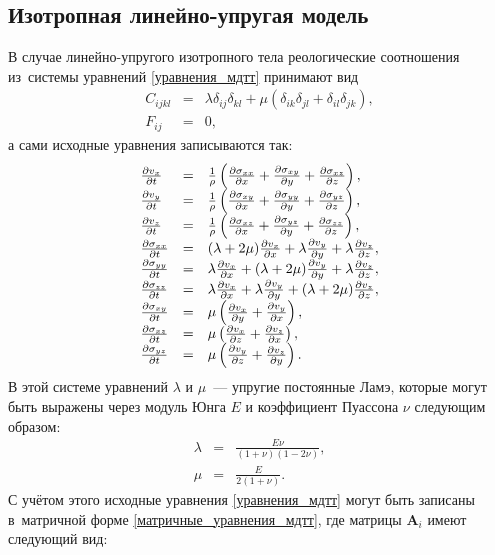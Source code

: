 \documentclass[thesis.tex]{subfiles}
\begin{document}
\subsection{Изотропная линейно-упругая модель}

В случае линейно-упругого изотропного тела реологические соотношения из~системы уравнений \eqref{уравнения_мдтт}  принимают
\cite{ландау1987теория} вид
\[
\begin{array}{lcl}
    C_{ijkl} &=& \lambda\delta_{ij}\delta_{kl} + \mu(\delta_{ik}\delta_{jl}+\delta_{il}\delta_{jk}), \\
    F_{ij} &=& 0,
\end{array}
\]
а сами исходные уравнения записываются так:
\[
\begin{array}{lcl}
    \PDt{v_x} &=&  \frac{1}{\rho}\left(\PDx{\Sxx} + \PDy{\Sxy} + \PDz{\Sxz} \right), \\
    \PDt{v_y} &=&  \frac{1}{\rho}\left(\PDx{\Sxy} + \PDy{\Syy} + \PDz{\Syz} \right), \\
    \PDt{v_z} &=&  \frac{1}{\rho}\left(\PDx{\Sxz} + \PDy{\Syz} + \PDz{\Szz} \right), \\

    \PDt{\Sxx} &=& (\lambda+2\mu)\PDx{v_x} + \lambda\PDy{v_y} + \lambda\PDz{v_z}, \\
    \PDt{\Syy} &=& \lambda\PDx{v_x} + (\lambda+2\mu)\PDy{v_y} + \lambda\PDz{v_z}, \\
    \PDt{\Szz} &=& \lambda\PDx{v_x} + \lambda\PDy{v_y} + (\lambda+2\mu)\PDz{v_z}, \\

    \PDt{\Sxy} &=&  \mu\left(\PDy{v_x} + \PDx{v_y}\right), \\
    \PDt{\Sxz} &=&  \mu\left(\PDz{v_x} + \PDx{v_z}\right), \\
    \PDt{\Syz} &=&  \mu\left(\PDz{v_y} + \PDy{v_z}\right). \\
\end{array}
\]
В этой системе уравнений $\lambda$ и $\mu$~--- упругие постоянные Ламэ, которые могут быть выражены через модуль Юнга
$E$ и коэффициент Пуассона $\nu$ следующим образом:
\[
\begin{array}{lcl}
    \lambda &=& \frac{E\nu}{(1+\nu)(1-2\nu)}, \\
    \mu &=& \frac{E}{2(1+\nu)}.
\end{array}
\]
С учётом этого исходные уравнения \eqref{уравнения_мдтт} могут быть записаны в~матричной форме
\eqref{матричные_уравнения_мдтт}, где матрицы $\mathbf A_i$ имеют следующий вид:
\end{document}
